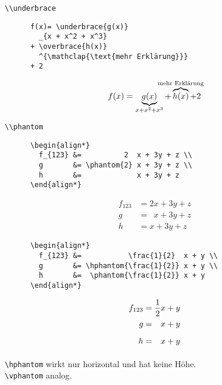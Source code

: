 \begin{frame}[fragile]{\lstinline+\\underbrace+}
  \begin{CodeExample}{0.58}
    \begin{lstlisting}
      f(x)= \underbrace{g(x)}
        _{x + x^2 + x^3}
      + \overbrace{h(x)}
        ^{\mathclap{\text{mehr Erklärung}}}
      + 2
    \end{lstlisting}
  \CodeResult
    \begin{equation*}
      f(x)= \underbrace{g(x)}_{x + x^2 + x^3}
      + \overbrace{h(x)}^{
        \mathclap{\text{mehr Erklärung}}
      } + 2
    \end{equation*}
  \end{CodeExample}
\end{frame}

\begin{frame}[fragile]{\lstinline+\\phantom+}
  \begin{CodeExample}{0.60}
    \begin{lstlisting}
      \begin{align*}
        f_{123} &=          2  x + 3y + z \\
        g       &= \phantom{2} x + 3y + z \\
        h       &=             x + 3y + z
      \end{align*}
    \end{lstlisting}
  \CodeResult%
  \removedisplayskip
    \begin{align*}
      f_{123} &=          2  x + 3y + z \\
      g       &= \phantom{2} x + 3y + z \\
      h       &=             x + 3y + z
    \end{align*}
  \end{CodeExample}
  \begin{CodeExample}{0.70}
    \begin{lstlisting}
      \begin{align*}
        f_{123} &=           \frac{1}{2}  x + y \\
        g       &= \hphantom{\frac{1}{2}} x + y \\
        h       &=  \phantom{\frac{1}{2}} x + y
      \end{align*}
    \end{lstlisting}
  \CodeResult
    \removedisplayskip
    \begin{align*}
      f_{123} &=           \frac{1}{2}  x + y \\
      g       &= \hphantom{\frac{1}{2}} x + y \\
      h       &=  \phantom{\frac{1}{2}} x + y
    \end{align*}
  \end{CodeExample}
  \lstinline+\hphantom+ wirkt nur horizontal und hat keine Höhe. \\
  \lstinline+\vphantom+ analog.
\end{frame}

